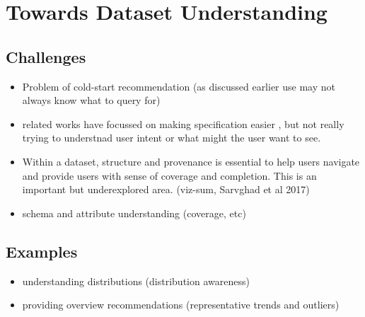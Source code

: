 \section{Towards Dataset Understanding\label{sec:understanding}}
\subsection{Challenges}
\begin{itemize}
\item Problem of cold-start recommendation (as discussed earlier use may not always know what to query for)
\item related works have focussed on making specification easier , but not really trying to understnad user intent or what might the user want to see.
\item Within a dataset, structure and provenance is essential to help users navigate and provide users with sense of coverage and completion. This is an important but underexplored area. (viz-sum, Sarvghad et al 2017)
\item schema and attribute understanding (coverage, etc) 
\end{itemize}

\subsection{Examples}
\begin{itemize}
	\item understanding distributions (distribution awareness)
	\item providing overview recommendations (representative trends and outliers)
\end{itemize}